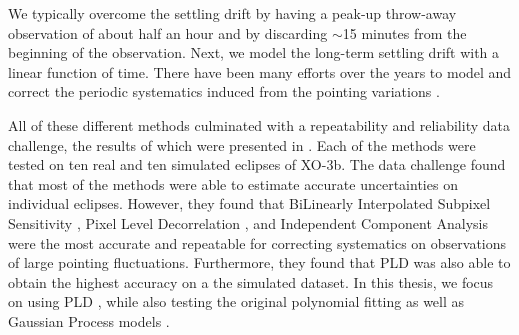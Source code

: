We typically overcome the settling drift by having a peak-up throw-away observation of about half an hour and by discarding $\sim$15 minutes from the beginning of the observation. Next, we model the long-term settling drift with a linear function of time. There have been many efforts over the years to model and correct the periodic systematics induced from the pointing variations \citep[e.g.,][]{Charbonneau2008,Ballard2010, Knutson2012,Stevenson2012, Evans2015, Morello2015a, Morello2015b, Buzasi2015, Deming2015, Krick2016}.

All of these different methods culminated with a repeatability and reliability data challenge, the results of which were presented in \citet{Ingalls2016}. Each of the methods were tested on ten real and ten simulated eclipses of XO-3b. The data challenge found that most of the methods were able to estimate accurate uncertainties on individual eclipses. However, they found that BiLinearly Interpolated Subpixel Sensitivity \citep[BLISS;][]{Stevenson2012}, Pixel Level Decorrelation \citep[PLD;][]{Deming2015}, and Independent Component Analysis \citep[ICA;][]{Morello2015a, Morello2015b} were the most accurate and repeatable for correcting systematics on observations of large pointing fluctuations. Furthermore, they found that PLD was also able to obtain the highest accuracy on a the simulated dataset. In this thesis, we focus on using PLD \citep{Deming2015}, while also testing the original polynomial fitting \citep{Charbonneau2008} as well as Gaussian Process models \citep[GP;][]{Evans2015}.

